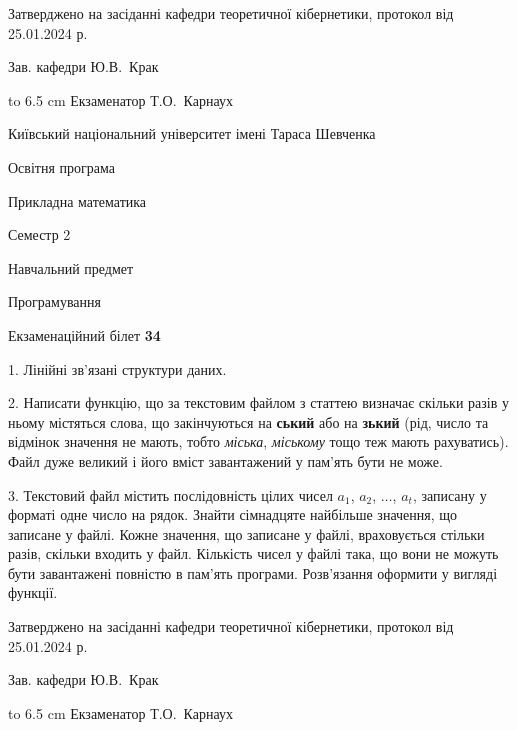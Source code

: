 \documentclass[12pt, ukrainian]{article}
\begin{document}
{\smallskip\smallskip \begin {scriptsize} Затверджено на засіданні кафедри теоретичної кібернетики, протокол   від   25.01.2024 р.\par\smallskip\smallskip\smallskip\smallskip
{\parbox {6.5 cm} {Зав. кафедри \dotfill Ю.В.~Крак}}\hspace {0.7cm} {\hbox to 6.5 cm { Екзаменатор \dotfill Т.О.~Карнаух}} \end{scriptsize}}
\newpage
{{\begin {scriptsize}\par
{ \center  Київський національний університет імені Тараса Шевченка \par}
{\parbox {5 cm}{Освітня програма \hfill}{\parbox {7 cm}{Прикладна математика\hfill}}\parbox {6 cm}{\hfill Семестр 2}}\par
{\parbox {5 cm} {Навчальний предмет \hfill}\parbox {7 cm}{Програмування \hfill}\parbox {6cm}{\hfill}\par}\vspace{-15pt} \end{scriptsize}}{\center Екзаменаційний білет \No \textbf { 34 }\par}}
{%
1. Лінійні зв’язані структури даних.%
\par
2. Написати функцію, що за текстовим файлом з статтею визначає  скільки разів у ньому містяться слова, що закінчуються на \textbf{ський} або на \textbf{зький} (рід, число та відмінок значення не мають, тобто \textit{міська}, \textit{міському} тощо теж мають рахуватись). Файл дуже великий і його вміст завантажений у пам'ять бути не може.

\par
3. Текстовий файл містить послідовність цілих чисел $a_1$, $a_2$, $\ldots$, $a_t$, записану у форматі одне число на рядок. Знайти сімнадцяте найбільше значення, що записане у файлі. Кожне значення, що записане у файлі, враховується стільки разів, скільки входить у файл. Кількість чисел у файлі така, що вони не можуть бути завантажені повністю в пам'ять програми. Розв'язання оформити у вигляді функції.

}
{\smallskip\smallskip \begin {scriptsize} Затверджено на засіданні кафедри теоретичної кібернетики, протокол   від   25.01.2024 р.\par\smallskip\smallskip\smallskip\smallskip
{\parbox {6.5 cm} {Зав. кафедри \dotfill Ю.В.~Крак}}\hspace {0.7cm} {\hbox to 6.5 cm { Екзаменатор \dotfill Т.О.~Карнаух}} \end{scriptsize}}
\end{document}
